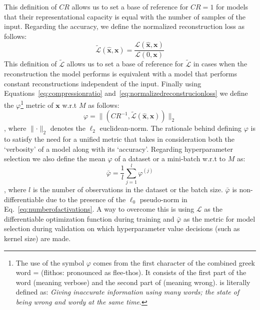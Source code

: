 \documentclass[journal]{IEEEtran}
\begin{document}
This definition of $CR$ allows us to set a base of reference for
$CR=1$ for models that their representational capacity is equal with
the number of samples of the input.
Regarding the accuracy, we define the normalized reconstruction loss as follows:
\begin{equation}
  \label{eq:normalizedreconstrucionloss}
  \tilde{\mathcal{L}}(\hat{\bm{x}},\bm{x}) =
  \frac{\mathcal{L}(\hat{\bm{x}},\bm{x})}{\mathcal{L}(0,\bm{x})}
\end{equation}
This definition of $\tilde{\mathcal{L}}$ allows us to set a base of
reference for $\tilde{\mathcal{L}}$ in cases when the reconstruction
the model performs is equivalent with a model that performs constant
reconstructions independent of the input.
Finally using Equations~\ref{eq:compressionratio}
and~\ref{eq:normalizedreconstrucionloss} we define the
$\varphi$\footnote{The use of the symbol $\varphi$ comes from the
  first character of the combined greek word {} =
  {} (flithos: pronounced as flee-thos). It
  consists of the first part of the word {}
  (meaning verbose) and the second part of {}
  (meaning wrong). {} is literally defined as:
  \textit{Giving inaccurate information using many words; the state of
being wrong and wordy at the same time}.} metric of $\bm{x}$ w.r.t
$M$ as follows:
\begin{equation}
  \label{eq:flithos}
  \varphi=\lVert(CR^{-1},\tilde{\mathcal{L}}(\hat{\bm{x}},\bm{x}))\rVert_2
\end{equation}
\noindent
, where $\lVert \cdot \rVert_2$ denotes the $\ell_2$ euclidean-norm.
The rationale behind defining $\varphi$ is to satisfy the need for a
unified metric that takes in consideration both the `verbosity' of a
model along with its `accuracy'.
Regarding hyperparameter selection we also define the mean $\varphi$
of a dataset or a mini-batch w.r.t to $M$ as:
\begin{equation}
  \label{eq:meanflithos}
  \bar\varphi = \frac{1}{l}\sum\limits_{j=1}^l \varphi^{(j)}
\end{equation}
\noindent
, where $l$ is the number of observations in the dataset or the batch size.
$\bar\varphi$ is non-differentiable due to the presence of the
$\ell_0$ pseudo-norm in Eq.~\ref{eq:numberofactivations}.
A way to overcome this is using $\mathcal{L}$ as the differentiable
optimization function during training and $\bar\varphi$ as the metric
for model selection during validation on which hyperparameter value
decisions (such as kernel size) are made.
\end{document}
